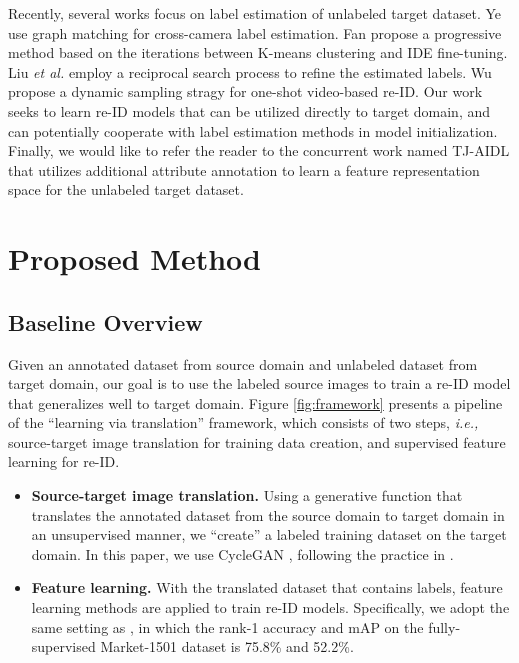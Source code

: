 \documentclass[10pt,twocolumn,letterpaper]{article}
\begin{document}
Recently, several works focus on label estimation of unlabeled target dataset. Ye \etal \cite{DBLP:journals/corr/abs-1709-09297} use graph matching for cross-camera label estimation. Fan \etal \cite{fan17unsupervised} propose a progressive method based on the iterations between K-means clustering and IDE \cite{DBLP:journals/corr/ZhengYH16} fine-tuning. Liu \emph{et al.} \cite{liu2017stepwise} employ a reciprocal search process to refine the estimated labels. Wu \etal \cite{wu2018exploit} propose a dynamic sampling stragy for one-shot video-based re-ID. Our work seeks to learn re-ID models that can be utilized directly to target domain, and can potentially cooperate with label estimation methods in model initialization.
Finally, we would like to refer the reader to the concurrent work named TJ-AIDL \cite{wang2018} that utilizes additional attribute annotation to learn a feature representation space for the unlabeled target dataset.



\section{Proposed Method} \label{Proposed Method}
\subsection{Baseline Overview}\label{sec:baseline}
Given an annotated dataset  from  source domain and unlabeled dataset  from  target domain, our goal is to use the labeled source images to train a re-ID model that generalizes well to target domain.  Figure \ref{fig:framework} presents a pipeline of the ``learning via translation'' framework, which consists of two steps, \emph{i.e.,} source-target image translation for training data creation, and supervised feature learning for re-ID.

\begin{itemize}
\setlength{\itemsep}{-0pt}

\item \textbf{Source-target image translation.} Using a generative function  that translates the annotated dataset  from the source domain to target domain in an unsupervised manner, we ``create'' a labeled training dataset  on the target domain. In this paper, we use CycleGAN \cite{cycle}, following the practice in \cite{DBLP:journals/corr/LiuBK17, cycledomain}.

\item \textbf{Feature learning.} With the translated dataset  that contains labels, feature learning methods are applied to train re-ID models. Specifically, we adopt the same setting as \cite{DBLP:journals/corr/ZhengYH16}, in which the rank-1 accuracy and mAP on the fully-supervised Market-1501 dataset is 75.8\% and 52.2\%.
\end{itemize}
\end{document}
